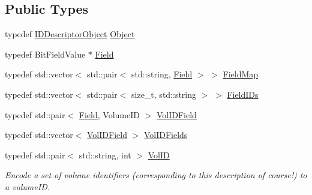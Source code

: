 \subsection*{Public Types}
\begin{DoxyCompactItemize}
\item 
typedef \hyperlink{class_d_d4hep_1_1_geometry_1_1_i_d_descriptor_object}{IDDescriptorObject} \hyperlink{class_d_d4hep_1_1_geometry_1_1_i_d_descriptor_a798e1c3f32519c2161daa79a7c842279}{Object}
\item 
typedef BitFieldValue $\ast$ \hyperlink{class_d_d4hep_1_1_geometry_1_1_i_d_descriptor_ac06f5915e74f8a8f2ff73e9a322556e4}{Field}
\item 
typedef std::vector$<$ std::pair$<$ std::string, \hyperlink{class_d_d4hep_1_1_geometry_1_1_i_d_descriptor_ac06f5915e74f8a8f2ff73e9a322556e4}{Field} $>$ $>$ \hyperlink{class_d_d4hep_1_1_geometry_1_1_i_d_descriptor_ac9d6740c50e0c5cf495486c55e5640d4}{FieldMap}
\item 
typedef std::vector$<$ std::pair$<$ size\_\-t, std::string $>$ $>$ \hyperlink{class_d_d4hep_1_1_geometry_1_1_i_d_descriptor_a0ced4a2fe6dd5775becad359f39a9ee2}{FieldIDs}
\item 
typedef std::pair$<$ \hyperlink{class_d_d4hep_1_1_geometry_1_1_i_d_descriptor_ac06f5915e74f8a8f2ff73e9a322556e4}{Field}, VolumeID $>$ \hyperlink{class_d_d4hep_1_1_geometry_1_1_i_d_descriptor_a29eabc3d9c0c0cfdc01c18e915114a71}{VolIDField}
\item 
typedef std::vector$<$ \hyperlink{class_d_d4hep_1_1_geometry_1_1_i_d_descriptor_a29eabc3d9c0c0cfdc01c18e915114a71}{VolIDField} $>$ \hyperlink{class_d_d4hep_1_1_geometry_1_1_i_d_descriptor_a6c4700a96f3a202eedaa25e54d5695ff}{VolIDFields}
\item 
typedef std::pair$<$ std::string, int $>$ \hyperlink{class_d_d4hep_1_1_geometry_1_1_i_d_descriptor_a6928b7adb965c1c276f22f62a0633750}{VolID}
\begin{DoxyCompactList}\small\item\em Encode a set of volume identifiers (corresponding to this description of course!) to a volumeID. \item\end{DoxyCompactList}\end{DoxyCompactItemize}
